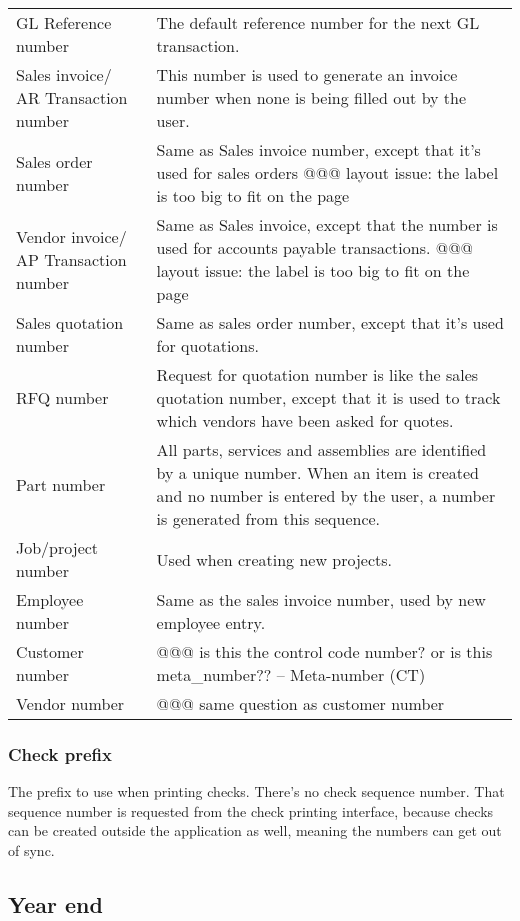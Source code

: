 \begin{longtable}{ p{3.4cm} p{6.7cm} }
GL Reference number & The default reference number for the next GL
transaction. \\
Sales invoice/ AR Transaction number & This number is used to generate an invoice
number when none is being filled out by the user. \\
Sales order number & Same as Sales invoice number, except that it's used for sales orders @@@ layout issue: the label is too big to fit on the page \\
Vendor invoice/ AP Transaction number & Same as Sales invoice, except that the number
is used for accounts payable transactions. @@@ layout issue: the label is too big to fit on the page \\
Sales quotation number & Same as sales order number, except that it's used for quotations. \\
RFQ number & Request for quotation number is like the sales quotation number, except
that it is used to track which vendors have been asked for quotes. \\
Part number & All parts, services and assemblies are identified by a unique number.
When an item is created and no number is entered by the user, a number is generated
from this sequence. \\
Job/project number & Used when creating new projects. \\
Employee number & Same as the sales invoice number, used by new employee entry. \\
Customer number & @@@ is this the control code number? or is this
meta\_number?? -- Meta-number (CT) \\
Vendor number & @@@ same question as customer number \\
\end{longtable}

\subsubsection{Check prefix} The prefix to use when printing checks. There's no check sequence number. That sequence number is requested from the check printing interface, because
checks can be created outside the application as well, meaning the numbers can
get out of sync.

\subsection{Year end}


